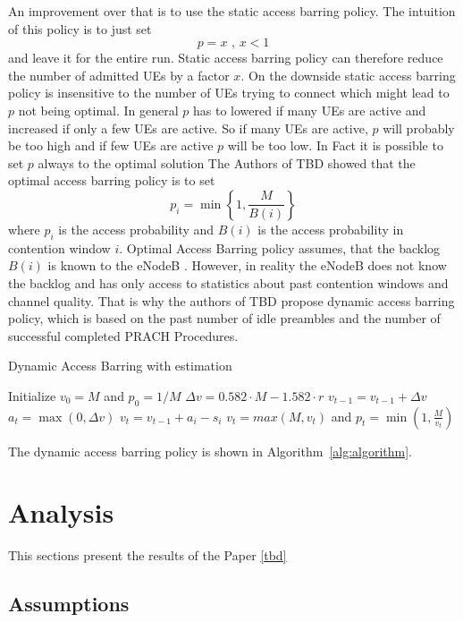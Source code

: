 \documentclass[conference]{IEEEtran}
\begin{document}
An improvement over that is to use the static access barring policy.
The intuition of this policy is to just set \[p=x \text{ ,  } x<1\] and leave it for the entire run.
Static access barring policy can therefore reduce the number of admitted UEs by a factor $x$.
On the downside static access barring policy is insensitive to the number of UEs trying to connect which might lead to $p$ not being optimal.
In general $p$ has to lowered if many UEs are active and increased if only a few UEs are active.
So if many UEs are active, $p$ will probably be too high and if few UEs are active $p$ will be too low.
In Fact it is possible to set $p$ always to the optimal solution
The Authors of TBD showed that the optimal access barring policy is to set \[p_i = \min\left\{1, \frac{M}{B(i)}\right\}\]
where $p_i$ is the access probability and $B(i)$ is the access probability in contention window $i$.
Optimal Access Barring policy assumes, that the backlog $B(i)$ is known to the eNodeB .
However, in reality the eNodeB does not know the backlog and has only access to statistics about past contention windows and channel quality.
That is why the authors of TBD propose dynamic access barring policy, which is based on the past number of idle preambles and the number of successful completed PRACH Procedures.

\begin{algorithm}
    \caption{Dynamic Access Barring with estimation}\label{alg:algorithm}
\begin{algorithmic}[1]
    \State Initialize $v_0=M$ and $p_0=1/M$
        \State $\Delta v = 0.582\cdot M - 1.582\cdot r$
        \State $v_{t-1} =v_{t-1}+\Delta v$
        \State $a_t = \max(0, \Delta v)$
        \State $v_t =v_{t-1}+a_i-s_i$
    \EndIf
    \State $v_t= max(M, v_t)$ and $p_t =\min\left(1,\frac{M}{v_t}\right)$
\end{algorithmic}
\end{algorithm}
The dynamic access barring policy is shown in Algorithm~\ref{alg:algorithm}.


\section{Analysis}
This sections present the results of the Paper \ref{tbd}
\subsection{Assumptions}\label{assumptions_analysis}
\end{document}
